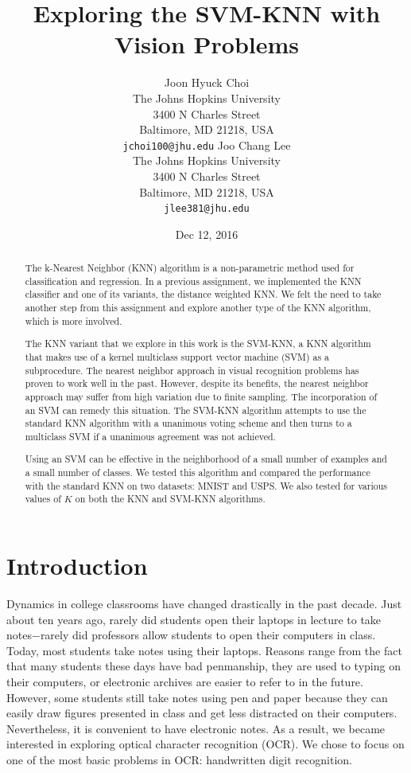 \documentclass[11pt,letterpaper]{article}
\title{Exploring the SVM-KNN with Vision Problems}
\author{Joon Hyuck Choi\\
  The Johns Hopkins University\\
  3400 N Charles Street\\
  Baltimore, MD 21218, USA\\
  {\tt jchoi100@jhu.edu}
  \And
  Joo Chang Lee \\
  The Johns Hopkins University \\
  3400 N Charles Street\\
  Baltimore, MD 21218, USA\\
  {\tt jlee381@jhu.edu}}
\date{Dec 12, 2016}
\begin{document}
\maketitle
\begin{abstract}
The k-Nearest Neighbor (KNN) algorithm is a non-parametric method used for classification and regression. In a previous assignment, we implemented the KNN classifier and one of its variants, the distance weighted KNN. We felt the need to take another step from this assignment and explore another type of the KNN algorithm, which is more involved.

The KNN variant that we explore in this work is the SVM-KNN, a KNN algorithm that makes use of a kernel multiclass support vector machine (SVM) as a subprocedure. The nearest neighbor approach in visual recognition problems has proven to work well in the past. However, despite its benefits, the nearest neighbor approach may suffer from high variation due to finite sampling. The incorporation of an SVM can remedy this situation. The SVM-KNN algorithm attempts to use the standard KNN algorithm with a unanimous voting scheme and then turns to a multiclass SVM if a unanimous agreement was not achieved.

Using an SVM can be effective in the neighborhood of a small number of examples and a small number of classes. We tested this algorithm and compared the performance with the standard KNN on two datasets: MNIST and USPS. We also tested for various values of $K$ on both the KNN and SVM-KNN algorithms.

\end{abstract}

\section{Introduction}

Dynamics in college classrooms have changed drastically in the past decade. Just about ten years ago, rarely did students open their laptops in lecture to take notes$-$rarely did professors allow students to open their computers in class. Today, most students take notes using their laptops. Reasons range from the fact that many students these days have bad penmanship, they are used to typing on their computers, or electronic archives are easier to refer to in the future. However, some students still take notes using pen and paper because they can easily draw figures presented in class and get less distracted on their computers. Nevertheless, it is convenient to have electronic notes. As a result, we became interested in exploring optical character recognition (OCR). We chose to focus on one of the most basic problems in OCR: handwritten digit recognition.
\end{document}
